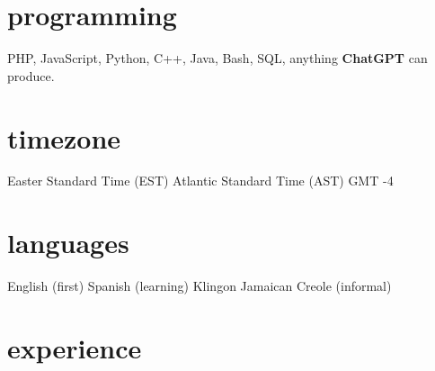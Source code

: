 \documentclass[]{friggeri-cv} %
\begin{document}
\begin{aside}
\section{programming}
 PHP, JavaScript, Python, C++, Java, Bash, SQL, anything \textbf{ChatGPT} can produce.
\section{timezone}
Easter Standard Time (EST)
Atlantic Standard Time (AST)
GMT -4
\section{languages}
English (first)
Spanish (learning)
Klingon
Jamaican Creole (informal)
\end{aside}


\section{experience}
\end{document}
